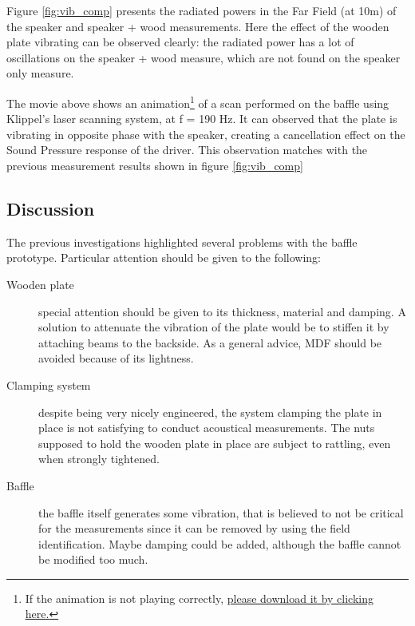 \documentclass{report}
\begin{document}
Figure \ref{fig:vib_comp} presents the radiated powers in the Far Field (at 10m) of the speaker and speaker + wood measurements. Here the effect of the wooden plate vibrating can be observed clearly: the radiated power has a lot of oscillations on the speaker + wood measure, which are not found on the speaker only measure. 

\begin{center}
\end{center}

The movie above shows an animation\footnote{If the animation is not playing correctly, \href{https://www.dropbox.com/sh/1jlodpb3biuxmhy/AADFRz8B249n8ERu3nkwyyisa?dl=0}{please download it by clicking \underline{here}.}} of a scan performed on the baffle using Klippel's laser scanning system, at f = 190 Hz. It can observed that the plate is vibrating in opposite phase with the speaker, creating a cancellation effect on the Sound Pressure response of the driver. This observation matches with the previous measurement results shown in figure \ref{fig:vib_comp}



\subsection{Discussion}

The previous investigations highlighted several problems with the baffle prototype. Particular attention should be given to the following:
\begin{description}
\item[Wooden plate] special attention should be given to its thickness, material and damping. A solution to attenuate the vibration of the plate would be to stiffen it by attaching beams to the backside. As a general advice, MDF should be avoided because of its lightness. 
\item[Clamping system] despite being very nicely engineered, the system clamping the plate in place is not satisfying to conduct acoustical measurements. The nuts supposed to hold the wooden plate in place are subject to rattling, even when strongly tightened.
\item[Baffle] the baffle itself generates some vibration, that is believed to not be critical for the measurements since it can be removed by using the field identification. Maybe damping could be added, although the baffle cannot be modified too much. 
\end{description}
\end{document}
